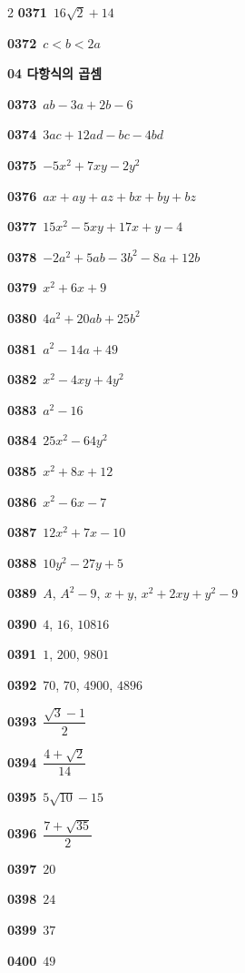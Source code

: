 \documentclass[10pt,a4paper]{article}
\begin{document}
\begin{multicols}{2}
\noindent\textbf{0371}\ $16\sqrt{2}+14$\par
\noindent\textbf{0372}\ $c<b<2a$\par
\noindent\textbf{04 다항식의 곱셈}\par\smallskip
\noindent\textbf{0373}\ $ab-3a+2b-6$\par
\noindent\textbf{0374}\ $3ac+12ad-bc-4bd$\par
\noindent\textbf{0375}\ $-5x^2+7xy-2y^2$\par
\noindent\textbf{0376}\ $ax+ay+az+bx+by+bz$\par
\noindent\textbf{0377}\ $15x^2-5xy+17x+y-4$\par
\noindent\textbf{0378}\ $-2a^2+5ab-3b^2-8a+12b$\par
\noindent\textbf{0379}\ $x^2+6x+9$\par
\noindent\textbf{0380}\ $4a^2+20ab+25b^2$\par
\noindent\textbf{0381}\ $a^2-14a+49$\par
\noindent\textbf{0382}\ $x^2-4xy+4y^2$\par
\noindent\textbf{0383}\ $a^2-16$\par
\noindent\textbf{0384}\ $25x^2-64y^2$\par
\noindent\textbf{0385}\ $x^2+8x+12$\par
\noindent\textbf{0386}\ $x^2-6x-7$\par
\noindent\textbf{0387}\ $12x^2+7x-10$\par
\noindent\textbf{0388}\ $10y^2-27y+5$\par
\noindent\textbf{0389}\ $A$, $A^2-9$, $x+y$, $x^2+2xy+y^2-9$\par
\noindent\textbf{0390}\ $4$, $16$, $10816$\par
\noindent\textbf{0391}\ $1$, $200$, $9801$\par
\noindent\textbf{0392}\ $70$, $70$, $4900$, $4896$\par
\noindent\textbf{0393}\ $\dfrac{\sqrt{3}-1}{2}$\par
\noindent\textbf{0394}\ $\dfrac{4+\sqrt{2}}{14}$\par
\noindent\textbf{0395}\ $5\sqrt{10}-15$\par
\noindent\textbf{0396}\ $\dfrac{7+\sqrt{35}}{2}$\par
\noindent\textbf{0397}\ $20$\par
\noindent\textbf{0398}\ $24$\par
\noindent\textbf{0399}\ $37$\par
\noindent\textbf{0400}\ $49$\par

\end{multicols}
\end{document}
